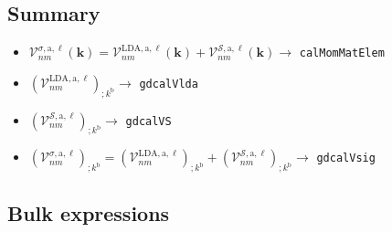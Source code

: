 
\subsection{Summary}
\begin{itemize}
\item
$\mathcal{V}^{\sigma,\mathrm{a},\ell}_{nm}(\mathbf{k})=\mathcal{V}^{\mathrm{LDA},\mathrm{a},\ell}_{nm}(\mathbf{k})+\mathcal{V}^{\mathcal{S},\mathrm{a},\ell}_{nm}(\mathbf{k})\to$
\verb=calMomMatElem= 

\item $\left(\mathcal{V}^{\mathrm{LDA},\mathrm{a},\ell}_{nm}\right)_{;k^\mathrm{b}}\to$
\verb=gdcalVlda= 

\item $\left(\mathcal{V}^{\mathcal{S},\mathrm{a},\ell}_{nm}\right)_{;k^\mathrm{b}}\to$ 
\verb=gdcalVS=

\item $\left(\mathcal{V}^{\sigma,\mathrm{a},\ell}_{nm}\right)_{;k^\mathrm{b}}=
\left(\mathcal{V}^{\mathrm{LDA},\mathrm{a},\ell}_{nm}\right)_{;k^\mathrm{b}}+\left(\mathcal{V}^{\mathcal{S},\mathrm{a},\ell}_{nm}\right)_{;k^\mathrm{b}}\to$ 
\verb=gdcalVsig=
\end{itemize}



\subsection{Bulk expressions}

